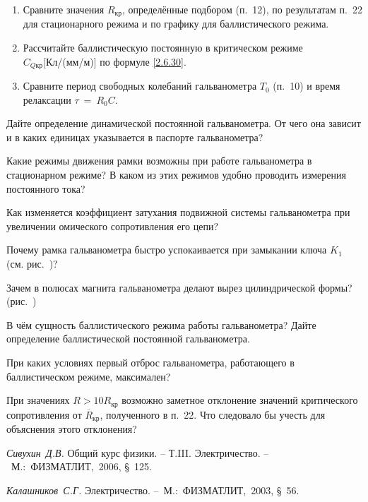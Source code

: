 \begin{lab:task}
\begin{enumerate}
	\item Сравните значения $R_{\text{кр}}$, определённые подбором (п.~12), по результатам
п.~22 для стационарного режима и по графику для баллистического режима.

	\item Рассчитайте баллистическую постоянную в критическом режиме\\$C_{Q \text{кр}}$[Кл/(мм/м)] по формуле \eqref{2.6.30}.

	\item Сравните период свободных колебаний гальванометра
$T_0$ (п.~10) и время релаксации $\tau~=~R_0C$.

	\end{enumerate}
\end{lab:task}

\begin{lab:questions}

	\item Дайте определение динамической постоянной гальванометра. От чего она
зависит и в каких единицах указывается в паспорте гальванометра?

	\item Какие режимы движения рамки возможны при работе гальванометра в
стационарном режиме? В каком из этих режимов удобно проводить измерения
постоянного тока?

	\item Как изменяется коэффициент затухания подвижной системы гальванометра
при увеличении омического сопротивления его цепи?

	\item Почему рамка гальванометра быстро успокаивается при замыкании ключа
$K_1$ (см. рис.~)?

	\item Зачем в полюсах магнита гальванометра делают вырез цилиндрической
формы? (рис.~)

	\item В чём сущность баллистического режима работы гальванометра? Дайте
определение баллистической постоянной гальванометра.

	\item При каких условиях первый отброс гальванометра, работающего в
баллистическом режиме, максимален?

	\item При значениях $R>10R_{\text{кр}}$
возможно заметное отклонение значений критического сопротивления от $\overline R_{\text{кр}}$,
полученного в п.~22. Что следовало бы учесть для объяснения этого
отклонения?
\end{lab:questions}

\begin{lab:literature}
	\item \emph{Сивухин~Д.В.} Общий курс физики. -- Т.III. Электричество. -- ~М.:~ФИЗМАТЛИТ,~2006, \S~125.

	\item \emph{Калашников~С.Г.} Электричество. --~М.:~ФИЗМАТЛИТ,~2003, \S~56.
\end{lab:literature}
